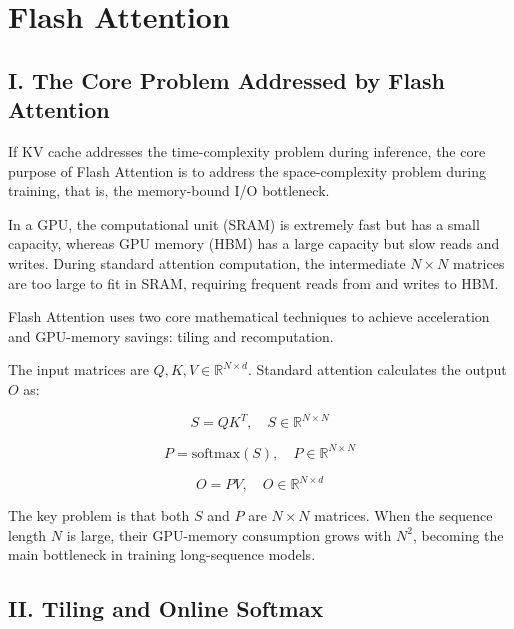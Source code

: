 \setcounter{section}{1}

\hypertarget{flash-attention}{%
\section{Flash Attention}\label{flash-attention}}

\hypertarget{i.-the-core-problem-addressed-by-flash-attention}{%
\subsection{I. The Core Problem Addressed by Flash Attention}\label{i.-the-core-problem-addressed-by-flash-attention}}

If KV cache addresses the time-complexity problem during inference, the core purpose of Flash Attention is to address the space-complexity problem during training, that is, the memory-bound I/O bottleneck.

In a GPU, the computational unit (SRAM) is extremely fast but has a small capacity, whereas GPU memory (HBM) has a large capacity but slow reads and writes. During standard attention computation, the intermediate \(N \times N\) matrices are too large to fit in SRAM, requiring frequent reads from and writes to HBM.

Flash Attention uses two core mathematical techniques to achieve acceleration and GPU-memory savings: tiling and recomputation.

The input matrices are \(Q,K,V \in \mathbb{R}^{N \times d}\). Standard attention calculates the output \(O\) as:

\[
S = QK^T,\quad S \in \mathbb{R}^{N \times N}
\]

\[
P = \mathrm{softmax}(S),\quad P \in \mathbb{R}^{N \times N}
\]

\[
O = PV,\quad O \in \mathbb{R}^{N \times d}
\]

The key problem is that both \(S\) and \(P\) are \(N \times N\) matrices. When the sequence length \(N\) is large, their GPU-memory consumption grows with \(N^2\), becoming the main bottleneck in training long-sequence models.

\hypertarget{ii.-tiling-and-online-softmax}{%
\subsection{II. Tiling and Online Softmax}\label{ii.-tiling-and-online-softmax}}

